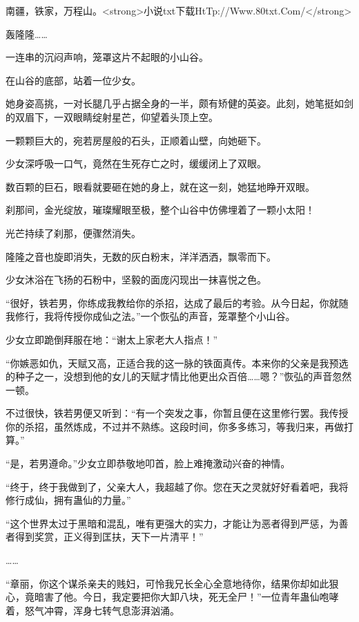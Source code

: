 
\begin{this_body}

南疆，铁家，万程山。<strong>小说txt下载HtTp://Www.80txt.Com/</strong>

轰隆隆……

一连串的沉闷声响，笼罩这片不起眼的小山谷。

在山谷的底部，站着一位少女。

她身姿高挑，一对长腿几乎占据全身的一半，颇有矫健的英姿。此刻，她笔挺如剑的双眉下，一双眼睛绽射星芒，仰望着头顶上空。

一颗颗巨大的，宛若房屋般的石头，正顺着山壁，向她砸下。

少女深呼吸一口气，竟然在生死存亡之时，缓缓闭上了双眼。

数百颗的巨石，眼看就要砸在她的身上，就在这一刻，她猛地睁开双眼。

刹那间，金光绽放，璀璨耀眼至极，整个山谷中仿佛埋着了一颗小太阳！

光芒持续了刹那，便骤然消失。

隆隆之音也旋即消失，无数的灰白粉末，洋洋洒洒，飘零而下。

少女沐浴在飞扬的石粉中，坚毅的面庞闪现出一抹喜悦之色。

“很好，铁若男，你练成我教给你的杀招，达成了最后的考验。从今日起，你就随我修行，我将传授你成仙之法。”一个恢弘的声音，笼罩整个小山谷。

少女立即跪倒拜服在地：“谢太上家老大人指点！”

“你嫉恶如仇，天赋又高，正适合我的这一脉的铁面真传。本来你的父亲是我预选的种子之一，没想到他的女儿的天赋才情比他更出众百倍……嗯？”恢弘的声音忽然一顿。

不过很快，铁若男便又听到：“有一个突发之事，你暂且便在这里修行罢。我传授你的杀招，虽然炼成，不过并不熟练。这段时间，你多多练习，等我归来，再做打算。”

“是，若男遵命。”少女立即恭敬地叩首，脸上难掩激动兴奋的神情。

“终于，终于我做到了，父亲大人，我超越了你。您在天之灵就好好看着吧，我将修行成仙，拥有蛊仙的力量。”

“这个世界太过于黑暗和混乱，唯有更强大的实力，才能让为恶者得到严惩，为善者得到奖赏，正义得到匡扶，天下一片清平！”

……

“章丽，你这个谋杀亲夫的贱妇，可怜我兄长全心全意地待你，结果你却如此狠心，竟暗害了他。今日，我定要把你大卸八块，死无全尸！”一位青年蛊仙咆哮着，怒气冲霄，浑身七转气息澎湃汹涌。


\end{this_body}

